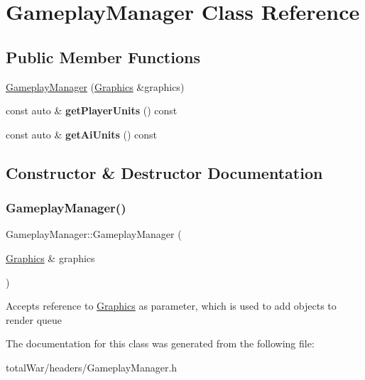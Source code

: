\hypertarget{class_gameplay_manager}{}\section{Gameplay\+Manager Class Reference}
\label{class_gameplay_manager}
\subsection*{Public Member Functions}
\begin{DoxyCompactItemize}
\item 
\hyperlink{class_gameplay_manager_a3d75567e65e16a90523a88337e690438}{Gameplay\+Manager} (\hyperlink{class_graphics}{Graphics} \&graphics)
\item 
\mbox{\label{class_gameplay_manager_af32be1b22d7597638c77513ee5c3cba4}} 
const auto \& {\bfseries get\+Player\+Units} () const
\item 
\mbox{\label{class_gameplay_manager_a633778a8cb5d909f2ab6d91e2456cfc5}} 
const auto \& {\bfseries get\+Ai\+Units} () const
\end{DoxyCompactItemize}


\subsection{Constructor \& Destructor Documentation}
\mbox{\label{class_gameplay_manager_a3d75567e65e16a90523a88337e690438}} 
\subsubsection{\texorpdfstring{Gameplay\+Manager()}{GameplayManager()}}
{\footnotesize\ttfamily Gameplay\+Manager\+::\+Gameplay\+Manager (\begin{DoxyParamCaption}\item[{\hyperlink{class_graphics}{Graphics} \&}]{graphics }\end{DoxyParamCaption})}

Accepts reference to \hyperlink{class_graphics}{Graphics} as parameter, which is used to add objects to render queue 

The documentation for this class was generated from the following file\+:\begin{DoxyCompactItemize}
\item 
total\+War/headers/Gameplay\+Manager.\+h\end{DoxyCompactItemize}
